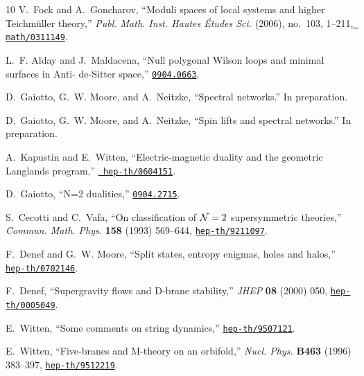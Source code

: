 \begin{thebibliography}{10}
V.~Fock and A.~Goncharov, ``Moduli spaces of local systems and higher
  {T}eichm\"uller theory,'' {\em Publ. Math. Inst. Hautes \'Etudes Sci.}
  (2006), no.~103, 1--211, \href{http://www.arXiv.org/abs/math/0311149}{{\tt
  math/0311149}}.

L.~F. Alday and J.~Maldacena, ``{Null polygonal Wilson loops and minimal
  surfaces in Anti- de-Sitter space},''
\href{http://www.arXiv.org/abs/0904.0663}{{\tt 0904.0663}}.

D.~Gaiotto, G.~W. Moore, and A.~Neitzke, ``{Spectral networks}.''
\newblock In preparation.

D.~Gaiotto, G.~W. Moore, and A.~Neitzke, ``Spin lifts and spectral networks.''
\newblock In preparation.

A.~Kapustin and E.~Witten, ``{E}lectric-magnetic duality and the geometric
  {L}anglands program,'' \href{http://www.arXiv.org/abs/hep-th/0604151}{{\tt
  hep-th/0604151}}.

D.~Gaiotto, ``{N=2 dualities},''
\href{http://www.arXiv.org/abs/0904.2715}{{\tt 0904.2715}}.

S.~Cecotti and C.~Vafa, ``On classification of {$\mathcal{N}=2$} supersymmetric
  theories,'' {\em Commun. Math. Phys.} {\bf 158} (1993) 569--644,
\href{http://www.arXiv.org/abs/hep-th/9211097}{{\tt hep-th/9211097}}.

F.~Denef and G.~W. Moore, ``Split states, entropy enigmas, holes and halos,''
\href{http://www.arXiv.org/abs/hep-th/0702146}{{\tt hep-th/0702146}}.

F.~Denef, ``{Supergravity flows and D-brane stability},'' {\em JHEP} {\bf 08}
  (2000) 050,
\href{http://www.arXiv.org/abs/hep-th/0005049}{{\tt hep-th/0005049}}.

E.~Witten, ``{Some comments on string dynamics},''
\href{http://www.arXiv.org/abs/hep-th/9507121}{{\tt hep-th/9507121}}.

E.~Witten, ``{Five-branes and M-theory on an orbifold},'' {\em Nucl. Phys.}
  {\bf B463} (1996) 383--397,
\href{http://www.arXiv.org/abs/hep-th/9512219}{{\tt hep-th/9512219}}.


\end{thebibliography}
